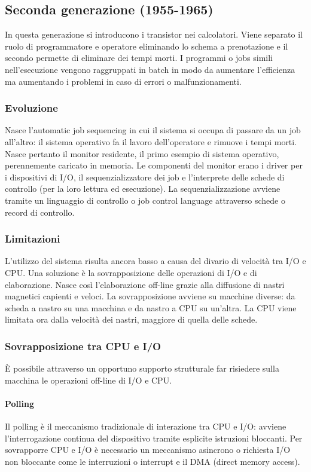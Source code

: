 \subsection{Seconda generazione (1955-1965)}
In questa generazione si introducono i transistor nei calcolatori. Viene separato il ruolo di programmatore e operatore eliminando lo schema  a prenotazione e il secondo permette di eliminare dei tempi morti.
I programmi o jobs simili nell'esecuzione vengono raggruppati in batch in modo da aumentare l'efficienza ma aumentando i problemi in caso di errori o malfunzionamenti.
\subsubsection{Evoluzione}
Nasce l'automatic job sequencing in cui il sistema si occupa di passare da un job all'altro: il sistema operativo fa il lavoro dell'operatore e rimuove i tempi morti. Nasce pertanto il monitor residente, il primo
esempio di sistema operativo, perennemente caricato in memoria. Le componenti del monitor erano i driver per i dispositivi di I/O, il sequenzializzatore dei job e l'interprete delle schede di controllo (per la loro
lettura ed esecuzione). La sequenzializzazione avviene tramite un linguaggio di controllo o job control language attraverso schede o record di controllo.
\subsubsection{Limitazioni}
L'utilizzo del sistema risulta ancora basso a causa del divario di velocit\`a tra I/O e CPU. Una soluzione \`e la sovrapposizione delle operazioni di I/O e di elaborazione. Nasce cos\`i l'elaborazione off-line grazie
alla diffusione di nastri magnetici capienti e veloci. La sovrapposizione avviene su macchine diverse: da scheda a nastro su una macchina e da nastro a CPU su un'altra. La CPU viene limitata ora dalla velocit\`a dei
nastri, maggiore di quella delle schede.
\subsubsection{Sovrapposizione tra CPU e I/O}
\`E possibile attraverso un opportuno supporto strutturale far risiedere sulla macchina le operazioni off-line di I/O e CPU.
\paragraph{Polling}
Il polling \`e il meccanismo tradizionale di interazione tra CPU e I/O: avviene l'interrogazione continua del dispositivo tramite esplicite istruzioni bloccanti. Per sovrapporre CPU e I/O \`e necessario un
meccanismo asincrono o richiesta  I/O non bloccante come le interruzioni o interrupt e il DMA (direct memory access).
